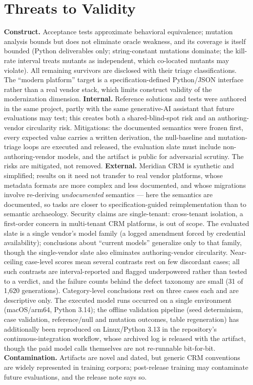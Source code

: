 \documentclass{ieeetj}
\begin{document}
\section{Threats to Validity}
\label{sec:threats}
\textbf{Construct.} Acceptance tests approximate behavioral equivalence; mutation analysis
bounds but does not eliminate oracle weakness, and its coverage is itself bounded (Python
deliverables only; string-constant mutations dominate; the kill-rate interval treats mutants
as independent, which co-located mutants may violate). All remaining survivors are disclosed with their triage classifications. The
``modern platform'' target is a specification-defined Python/JSON interface rather than a
real vendor stack, which limits construct validity of the modernization dimension.
\textbf{Internal.} Reference solutions and tests were authored in the same project, partly
with the same generative-AI assistant that future evaluations may test; this creates both a
shared-blind-spot risk and an authoring-vendor circularity risk. Mitigations: the documented
semantics were frozen first, every expected value carries a written derivation, the
null-baseline and mutation-triage loops are executed and released, the evaluation slate must
include non-authoring-vendor models, and the artifact is public for adversarial scrutiny.
The risks are mitigated, not removed. \textbf{External.} Meridian CRM is synthetic and
simplified; results on it need not transfer to real vendor platforms, whose metadata formats
are more complex and less documented, and whose migrations involve re-deriving
\emph{undocumented} semantics --- here the semantics are documented, so tasks are closer to
specification-guided reimplementation than to semantic archaeology. Security claims are
single-tenant: cross-tenant isolation, a first-order concern in multi-tenant CRM platforms,
is out of scope. The evaluated slate is a single vendor's model family (a logged amendment
forced by credential availability); conclusions about ``current models'' generalize only to
that family, though the single-vendor slate also eliminates authoring-vendor circularity.
Near-ceiling case-level scores mean several contrasts rest on few discordant cases; all such
contrasts are interval-reported and flagged underpowered rather than tested to a verdict,
and the failure counts behind the defect taxonomy are small (31 of 1{,}620 generations).
Category-level conclusions rest on three cases each and are descriptive only. The executed
model runs occurred on a single environment (macOS/arm64, Python 3.14); the offline
validation pipeline (seed determinism, case validation, reference/null and mutation
outcomes, table regeneration) has additionally been reproduced on Linux/Python 3.13 in the
repository's continuous-integration workflow, whose archived log is released with the
artifact, though the paid model calls themselves are not re-runnable bit-for-bit. \textbf{Contamination.} Artifacts are novel and
dated, but generic CRM conventions are widely represented in training corpora; post-release
training may contaminate future evaluations, and the release note says so.
\end{document}
